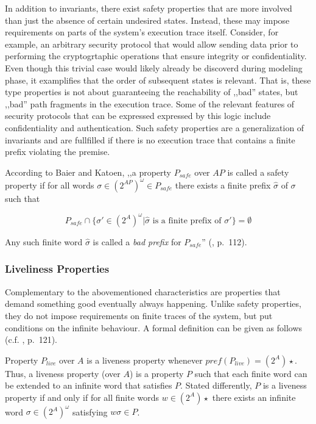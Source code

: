 In addition to invariants, there exist safety properties that are more involved than just the absence of certain undesired states.
Instead, these may impose requirements on parts of the system's execution trace itself.
Consider, for example, an arbitrary security protocol that would allow sending data prior to performing the cryptogrtaphic operations that ensure integrity or confidentiality.
Even though this trivial case would likely already be discoverd during modeling phase, it examplifies that the order of subsequent states is relevant.
That is, these type properties is not about guaranteeing the reachability of ,,bad'' states, but ,,bad'' path fragments in the execution trace.
Some of the relevant features of security protocols that can be expressed expressed by this logic include confidentiality and authentication.
Such safety properties are a generalization of invariants and are fullfilled if there is no execution trace that contains a finite prefix violating the premise.

According to Baier and Katoen, ,,a property $P_{safe}$ over $AP$ is called a safety property if for all words $\sigma \in (2^{AP})^{\omega} \in P_{safe}$ there exists a finite prefix $\widehat{\sigma}$ of $\sigma$ such that

\begin{equation*}
    P_{safe} \cap \{ \sigma' \in (2^{A})^{\omega} | \widehat{\sigma} \text{ is a finite prefix of } \sigma' \} = \emptyset
\end{equation*}

\noindent
Any such finite word $\widehat{\sigma}$ is called a \textit{bad prefix} for $P_{safe}$'' (\cite{baier2008principles}, p.~112).

\subsubsection{Liveliness Properties}

Complementary to the abovementioned characteristics are properties that demand something good eventually always happening.
Unlike safety properties, they do not impose requirements on finite traces of the system, but put conditions on the infinite behaviour.
A formal definition can be given as follows (c.f. \cite{baier2008principles}, p.~121).

Property $P_{live}$ over $A$ is a liveness property whenever $pref(P_{live}) = (2^{A})\star$.
Thus, a liveness property (over $A$) is a property $P$ such that each finite word can be extended to an infinite word that satisfies $P$.
Stated differently, $P$ is a liveness property if and only if for all finite words $w \in (2^{A})\star$ there exists an infinite word $\sigma \in (2^{A})^\omega$ satisfying $w \sigma \in P $.

